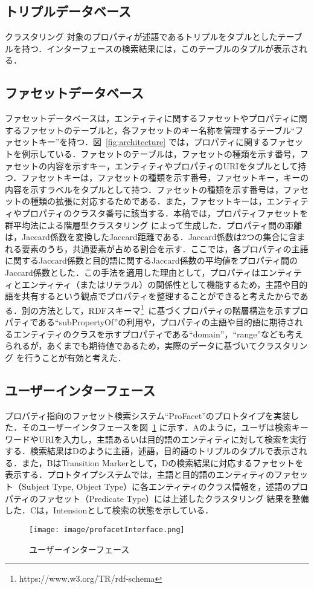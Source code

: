 \subsection{トリプルデータベース}
クラスタリング 対象のプロパティが述語であるトリプルをタプルとしたテーブルを持つ．インターフェースの検索結果には，このテーブルのタプルが表示される．
%
\subsection{ファセットデータベース}
ファセットデータベースは，エンティティに関するファセットやプロパティに関するファセットのテーブルと，各ファセットのキー名称を管理するテーブル``ファセットキー''を持つ．図~\ref{fig:architecture} では，プロパティに関するファセットを例示している．ファセットのテーブルは，ファセットの種類を示す番号，ファセットの内容を示すキー，エンティティやプロパティのURIをタプルとして持つ．ファセットキーは，ファセットの種類を示す番号，ファセットキー，キーの内容を示すラベルをタプルとして持つ．ファセットの種類を示す番号は，ファセットの種類の拡張に対応するためである．また，ファセットキーは，エンティティやプロパティのクラスタ番号に該当する．本稿では，プロパティファセットを群平均法による階層型クラスタリング によって生成した．プロパティ間の距離は，Jaccard係数を変換したJaccard距離である．Jaccard係数は2つの集合に含まれる要素のうち，共通要素が占める割合を示す．ここでは，各プロパティの主語に関するJaccard係数と目的語に関するJaccard係数の平均値をプロパティ間のJaccard係数とした．この手法を適用した理由として，プロパティはエンティティとエンティティ（またはリテラル）の関係性として機能するため，主語や目的語を共有するという観点でプロパティを整理することができると考えたからである．別の方法として，RDFスキーマ\footnote{https://www.w3.org/TR/rdf-schema}\ に基づくプロパティの階層構造を示すプロパティである``subPropertyOf''の利用や，プロパティの主語や目的語に期待されるエンティティのクラスを示すプロパティである``domain''，``range''なども考えられるが，あくまでも期待値であるため，実際のデータに基づいてクラスタリング を行うことが有効と考えた．
%
\subsection{ユーザーインターフェース}
プロパティ指向のファセット検索システム``ProFacet''のプロトタイプを実装した．そのユーザーインタフェースを図~\ref{fig:profacetInterface} に示す．Aのように，ユーザは検索キーワードやURIを入力し，主語あるいは目的語のエンティティに対して検索を実行する．検索結果はDのように主語，述語，目的語のトリプルのタプルで表示される．また，BはTransition Markerとして，Dの検索結果に対応するファセットを表示する．プロトタイプシステムでは，主語と目的語のエンティティのファセット（Subject Type, Object Type）に各エンティティのクラス情報を，述語のプロパティのファセット（Predicate Type）には上述したクラスタリング 結果を整備した．Cは，Intensionとして検索の状態を示している．

\begin{figure}[h]
\centering
\texttt{[image: image/profacetInterface.png]}
\caption{\small
ユーザーインターフェース
}
\label{fig:profacetInterface}
\end{figure}
